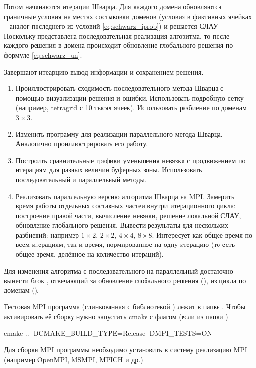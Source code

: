Потом начинаются итерации Шварца.
Для каждого домена обновляются граничные условия на местах состыковки доменов (условия в фиктивных ячейках -- аналог последнего из условий \cref{eq:schwarz_iprob})
и решается СЛАУ.
Поскольку представлена последовательная реализация алгоритма, то после каждого решения в домена
происходит обновление глобального решения по формуле \cref{eq:schwarz_un}.

Завершают итеарцию вывод информации и сохранением решения.


\begin{enumerate}
\item Проиллюстрировать сходимость последовательного метода Шварца с помощью визуализации решения и ошибки. Использовать подробную сетку (например, tetragrid с 10 тысяч ячеек).
      Использовать разбиение по доменам $3\times3$.
\item Изменить программу для реализации параллельного метода Шварца. Аналогично проиллюстрировать его работу.
\item Построить сравнительные графики уменьшения невязки с продвижением по итерациям для разных величин буферных зоны. Использовать последовательный и параллельный методы.
\item Реализовать параллельную версию алгоритма Шварца на MPI. Замерить время работы отдельных составных частей внутри итерационного цикла: построение правой части, вычисление невязки, решение локальной СЛАУ, обновление глобального решения. Вывести результаты для нескольких разбиений: например $1\times2$, $2\times2$, $4\times4$, $8\times8$. Интересует как общее время по всем итерациям, так и время, нормированное на одну итерацию (то есть общее время, делённое на количество итераций).
\end{enumerate}

Для изменения алгоритма с последовательного на параллельный достаточно вынести блок , отвечающий за обновление глобального решения (),
из цикла по доменам ().

Тестовая MPI программа (слинкованная с библиотекой ) лежит в папке .
Чтобы активировать её сборку нужно запустить cmake с флагом (если из папки )
\begin{bashcode}
cmake .. -DCMAKE_BUILD_TYPE=Release -DMPI_TESTS=ON
\end{bashcode}
Для сборки MPI программы необходимо установить в систему реализацию MPI (например OpenMPI, MSMPI, MPICH и др.)

